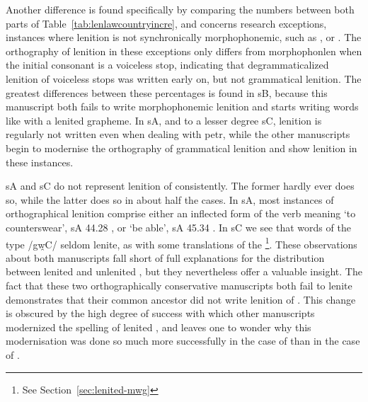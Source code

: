 Another difference is found specifically by comparing the numbers between both parts of Table~\ref{tab:lenlawcountryincre}, and concerns research exceptions, \ie instances where lenition is not synchronically morphophonemic, such as , or . The orthography of lenition in these exceptions only differs from \gls{morphophonlen} when the initial consonant is a voiceless stop, indicating that degrammaticalized lenition of voiceless stops was written early on, but not grammatical lenition. The greatest differences between these percentages is found in \gls{sB}, because this manuscript both fails to write morphophonemic lenition and starts writing words like  with a lenited grapheme. In \gls{sA}, and to a lesser degree \gls{sC}, lenition is regularly not written even when dealing with \gls{petr}, while the other manuscripts begin to modernise the orthography of grammatical lenition and show lenition in these instances.

\Gls{sA} and \gls{sC} do not represent lenition of  consistently. The former hardly ever does so, while the latter does so in about half the cases. In \gls{sA}, most instances of orthographical lenition comprise either an inflected form of the verb meaning `to counterswear', \eg \gls{sA} 44.28 , or `be able', \eg \gls{sA} 45.34 . In \gls{sC} we see that words of the type /gw̯\gls{C}/ seldom lenite, as with some translations of the \footnote{See Section~\ref{sec:lenited-mwg}}. These observations about both manuscripts fall short of full explanations for the distribution between lenited and unlenited , but they nevertheless offer a valuable insight. The fact that these two orthographically conservative manuscripts both fail to lenite  demonstrates that their common ancestor did not write lenition of . This change is obscured by the high degree of success with which other manuscripts modernized the spelling of lenited , and leaves one to wonder why this modernisation was done so much more successfully in the case of  than in the case of .

